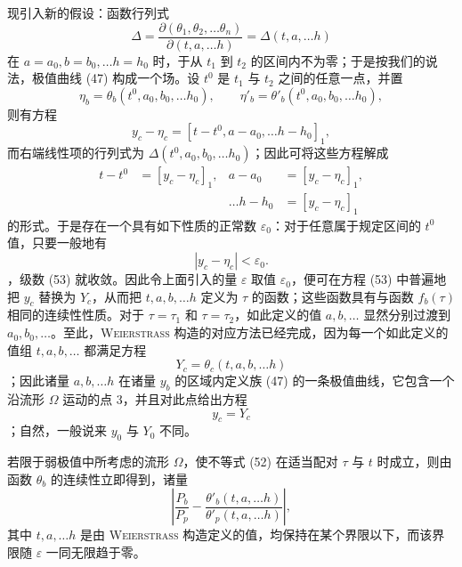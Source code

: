 \documentclass[11pt,a4paper,leqno]{article}
\begin{document}
现引入新的假设：函数行列式
\[
\Delta=
\frac{\partial(\theta_1,\theta_2,\ldots\theta_n)}
{\partial(t,a,\ldots h)}
=\Delta(t,a,\ldots h)
\]
在 $a=a_0,b=b_0,\ldots h=h_0$ 时，于从 $t_1$ 到 $t_2$ 的区间内不为零；于是按我们的说法，极值曲线 (47) 构成一个场。设 $t^0$ 是 $t_1$ 与 $t_2$ 之间的任意一点，并置
\[
\eta_b=\theta_b(t^0,a_0,b_0,\ldots h_0),
\qquad
\eta'_b=\theta'_b(t^0,a_0,b_0,\ldots h_0),
\]
则有方程
\[
y_c-\eta_c=[t-t^0,a-a_0,\ldots h-h_0]_1,
\]
而右端线性项的行列式为 $\Delta(t^0,a_0,b_0,\ldots h_0)$；因此可将这些方程解成
\begin{equation}\tag{53}
\begin{aligned}
t-t^0&=[y_c-\eta_c]_1,
&a-a_0&=[y_c-\eta_c]_1,\\
&&\ldots h-h_0&=[y_c-\eta_c]_1
\end{aligned}
\end{equation}
的形式。于是存在一个具有如下性质的正常数 $\varepsilon_0$：对于任意属于规定区间的 $t^0$ 值，只要一般地有
\[
|y_c-\eta_c|<\varepsilon_0.
\]
，级数 (53) 就收敛。因此令上面引入的量 $\varepsilon$ 取值 $\varepsilon_0$，便可在方程 (53) 中普遍地把 $y_c$ 替换为 $Y_c$，从而把 $t,a,b,\ldots h$ 定义为 $\tau$ 的函数；这些函数具有与函数 $f_b(\tau)$ 相同的连续性性质。对于 $\tau=\tau_1$ 和 $\tau=\tau_2$，如此定义的值 $a,b,\ldots$ 显然分别过渡到 $a_0,b_0,\ldots$。至此，\textsc{Weierstrass} 构造的对应方法已经完成，因为每一个如此定义的值组 $t,a,b,\ldots$ 都满足方程
\begin{equation}\tag{54}
Y_c=\theta_c(t,a,b,\ldots h)
\end{equation}
；因此诸量 $a,b,\ldots h$ 在诸量 $y_b$ 的区域内定义族 (47) 的一条极值曲线，它包含一个沿流形 $\Omega$ 运动的点 3，并且对此点给出方程
\[
y_c=Y_c
\]
；自然，一般说来 $y_0$ 与 $Y_0$ 不同。

若限于弱极值中所考虑的流形 $\Omega$，使不等式 (52) 在适当配对 $\tau$ 与 $t$ 时成立，则由函数 $\theta_b$ 的连续性立即得到，诸量
\begin{equation}\tag{55}
\left|
\frac{P_b}{P_p}
-\frac{\theta'_b(t,a,\ldots h)}{\theta'_p(t,a,\ldots h)}
\right|,
\end{equation}
其中 $t,a,\ldots h$ 是由 \textsc{Weierstrass} 构造定义的值，均保持在某个界限以下，而该界限随 $\varepsilon$ 一同无限趋于零。
\end{document}
